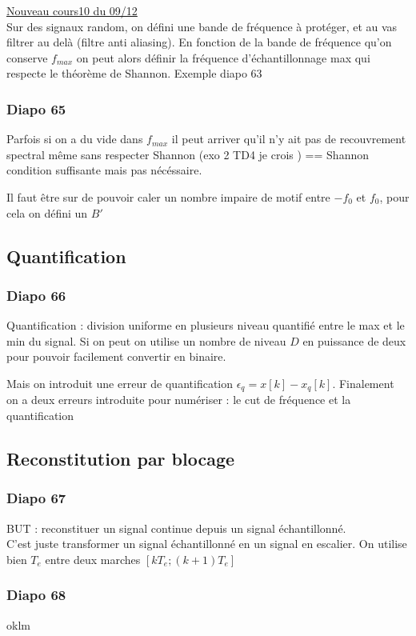 \documentclass{article}
\theoremstyle{plain}%
\theoremstyle{definition}
\theoremstyle{remark}
\begin{document}
\underline{Nouveau cours10 du 09/12} \\

Sur des signaux random, on défini une bande de fréquence à protéger, et au vas filtrer au delà (filtre anti aliasing). En fonction de la bande de fréquence qu'on conserve $ f_{max} $ on peut alors définir la fréquence d'échantillonnage max qui respecte le théorème de Shannon. Exemple diapo 63

\subsubsection{Diapo 65}
Parfois si on a du vide dans $ f_{max} $ il peut arriver qu'il n'y ait pas de recouvrement spectral même sans respecter Shannon (exo 2 TD4 je crois ) == Shannon condition suffisante mais pas nécéssaire.

Il faut être sur de pouvoir caler un nombre impaire de motif entre $ -f_0 $ et $ f_0 $, pour cela on défini un $ B' $ 

\subsection{Quantification}
\subsubsection{Diapo 66}
Quantification : division uniforme en plusieurs niveau quantifié entre le max et le min du signal. Si on peut on utilise un nombre de niveau $ D $ en puissance de deux pour pouvoir facilement convertir en binaire. 

Mais on introduit une erreur de quantification $ \epsilon _q = x[k] - x_q[k]$. Finalement on a deux erreurs introduite pour numériser : le cut de fréquence et la quantification

\subsection{Reconstitution par blocage}
\subsubsection{Diapo 67}
BUT : reconstituer un signal continue depuis un signal échantillonné. \\
C'est juste transformer un signal échantillonné en un signal en escalier. On utilise bien $ T_e $ entre deux marches $ [kT_e ; (k+1)T_e] $  

\subsubsection{Diapo 68}
oklm
\end{document}
